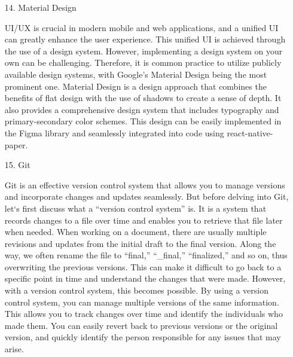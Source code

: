 \documentclass[conference, a4paper]{IEEEtran}
\begin{document}
\begin{enumerate}
\begin{enumerate}
        \item[14.]Material Design \cite{google-material-design}
        \item[]UI/UX is crucial in modern mobile and web applications, and a unified UI can greatly enhance the user experience. This unified UI is achieved through the use of a design system. However, implementing a design system on your own can be challenging. Therefore, it is common practice to utilize publicly available design systems, with Google's Material Design being the most prominent one. Material Design is a design approach that combines the benefits of flat design with the use of shadows to create a sense of depth. It also provides a comprehensive design system that includes typography and primary-secondary color schemes. This design can be easily implemented in the Figma library and seamlessly integrated into code using react-native-paper. \\

        \item[15.]Git \cite{velog-git}
        \item[]Git is an effective version control system that allows you to manage versions and incorporate changes and updates seamlessly. But before delving into Git, let`s first discuss what a ``version control system'' is. It is a system that records changes to a file over time and enables you to retrieve that file later when needed. When working on a document, there are usually multiple revisions and updates from the initial draft to the final version. Along the way, we often rename the file to ``final,'' ``\_final,'' ``finalized,'' and so on, thus overwriting the previous versions. This can make it difficult to go back to a specific point in time and understand the changes that were made. However, with a version control system, this becomes possible. By using a version control system, you can manage multiple versions of the same information. This allows you to track changes over time and identify the individuals who made them. You can easily revert back to previous versions or the original version, and quickly identify the person responsible for any issues that may arise.\\
    \end{enumerate}
\end{enumerate}
\end{document}
